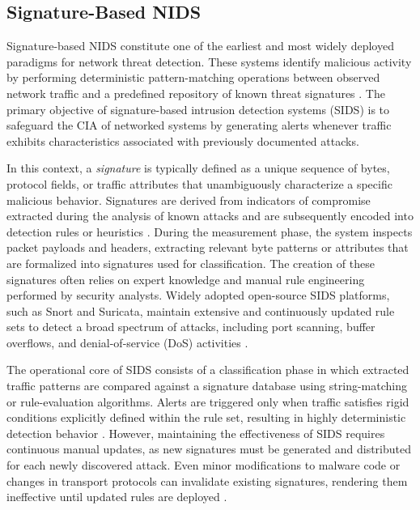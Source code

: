 \subsection{Signature-Based NIDS}

Signature-based NIDS constitute one of the earliest and most widely deployed paradigms for network threat detection. These systems identify malicious activity by performing deterministic pattern-matching operations between observed network traffic and a predefined repository of known threat signatures \cite{sun2024gnn, ahmed2025signature}. The primary objective of signature-based intrusion detection systems (SIDS) is to safeguard the CIA of networked systems by generating alerts whenever traffic exhibits characteristics associated with previously documented attacks.

In this context, a \emph{signature} is typically defined as a unique sequence of bytes, protocol fields, or traffic attributes that unambiguously characterize a specific malicious behavior. Signatures are derived from indicators of compromise extracted during the analysis of known attacks and are subsequently encoded into detection rules or heuristics \cite{10005100, yuan2024simple}. During the measurement phase, the system inspects packet payloads and headers, extracting relevant byte patterns or attributes that are formalized into signatures used for classification. The creation of these signatures often relies on expert knowledge and manual rule engineering performed by security analysts. Widely adopted open-source SIDS platforms, such as Snort and Suricata, maintain extensive and continuously updated rule sets to detect a broad spectrum of attacks, including port scanning, buffer overflows, and denial-of-service (DoS) activities \cite{ahmed2025signature, cui2023cbseq}.

The operational core of SIDS consists of a classification phase in which extracted traffic patterns are compared against a signature database using string-matching or rule-evaluation algorithms. Alerts are triggered only when traffic satisfies rigid conditions explicitly defined within the rule set, resulting in highly deterministic detection behavior \cite{shaukat2022novel, alotaibi2023adversarial}. However, maintaining the effectiveness of SIDS requires continuous manual updates, as new signatures must be generated and distributed for each newly discovered attack. Even minor modifications to malware code or changes in transport protocols can invalidate existing signatures, rendering them ineffective until updated rules are deployed \cite{ahmed2025network}.

